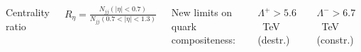 \documentclass[compress]{beamer}
\begin{document}
\begin{frame}
{\begin{columns}

\vspace{-0.6 cm}
Centrality ratio

\vspace{0.1 cm}
\mbox{$\displaystyle R_\eta = \frac{N_{jj}(|\eta| < 0.7)}{N_{jj}(0.7 < |\eta| < 1.3)}$}

\vspace{0.1 cm}
New limits on quark compositeness:

\vspace{0.1 cm}
\hspace{0.25 cm} $\Lambda^+ > 5.6$~TeV \mbox{\scriptsize (destr.)\hspace{-1 cm}}

\hspace{0.25 cm} $\Lambda^- > 6.7$~TeV \mbox{\scriptsize (constr.)\hspace{-1 cm}}
\end{columns}}
\end{frame}
\end{document}
